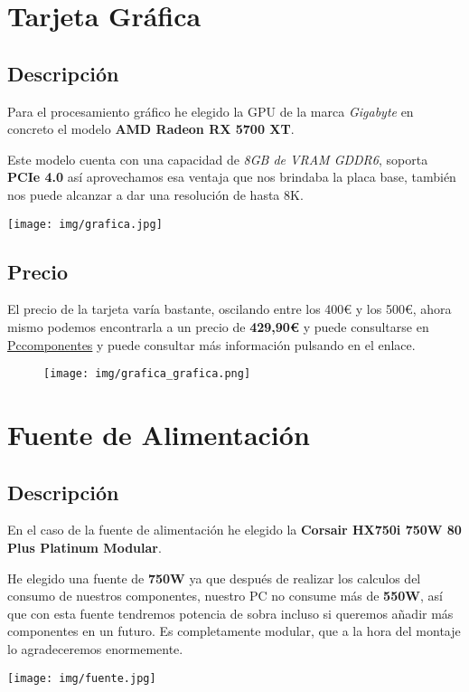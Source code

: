 \documentclass{article}
\begin{document}
  \newpage
    \section{Tarjeta Gráfica}
      \subsection{Descripción}
        Para el procesamiento gráfico he elegido la GPU de la marca \textit{Gigabyte} en concreto el modelo \textbf{AMD Radeon RX 5700 XT}.
        \\
        \begin{minipage}{0.5\textwidth}
         Este modelo cuenta con una capacidad de \textit{8GB de VRAM GDDR6}, soporta \textbf{PCIe 4.0} así aprovechamos esa ventaja que nos brindaba la placa base, también nos puede alcanzar a dar una resolución de hasta 8K.
        \end{minipage}
        \begin{minipage}{\textwidth}
          \texttt{[image: img/grafica.jpg]}
        \end{minipage}
      \subsection{Precio}
        El precio de la tarjeta varía bastante, oscilando entre los 400€ y los 500€, ahora mismo podemos encontrarla a un precio de 
        \textbf{429,90€} y puede consultarse en 
        \href{https://www.pccomponentes.com/gigabyte-amd-radeon-rx-5700-xt-gaming-oc-8gb-gddr6}{Pccomponentes} y puede consultar más información pulsando en el enlace.
        \\
        \begin{figure}[h]
          \centering
          \texttt{[image: img/grafica\_grafica.png]}
        \end{figure}

  \newpage
    \section{Fuente de Alimentación}
      \subsection{Descripción}
        En el caso de la fuente de alimentación he elegido la \textbf{Corsair HX750i 750W 80 Plus Platinum Modular}.
        
        \begin{minipage}{0.5\textwidth}
          He elegido una fuente de \textbf{750W} ya que después de realizar los calculos del consumo de nuestros componentes, nuestro PC no consume más de \textbf{550W}, así que con esta fuente tendremos potencia de sobra 
          incluso si queremos añadir más componentes en un futuro. Es completamente modular, que a la hora del montaje lo agradeceremos enormemente.
        \end{minipage}
        \begin{minipage}{\textwidth}
          \texttt{[image: img/fuente.jpg]}
        \end{minipage}
\end{document}
